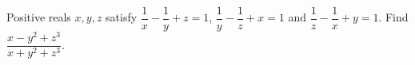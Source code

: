 Positive reals $x,y,z$ satisfy $\dfrac1x-\dfrac1y+z=1$, $\dfrac1y-\dfrac1z+x=1$ and $\dfrac1z-\dfrac1x+y=1$. Find $\dfrac{x-y^2+z^3}{x+y^2+z^3}$.

